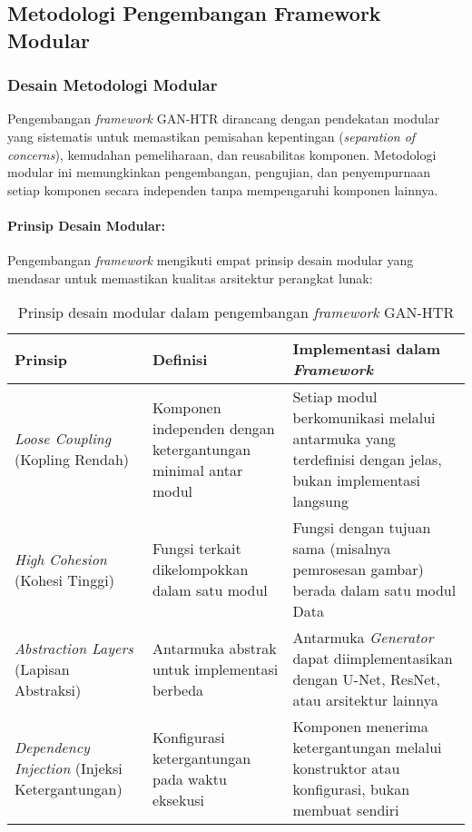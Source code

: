 \documentclass[12pt,a4paper]{article}
\begin{document}
\subsection{Metodologi Pengembangan Framework Modular}
\label{subsec:framework-modular}

\subsubsection{Desain Metodologi Modular}
Pengembangan \textit{framework} GAN-HTR dirancang dengan pendekatan modular yang sistematis untuk memastikan pemisahan kepentingan (\textit{separation of concerns}), kemudahan pemeliharaan, dan reusabilitas komponen. Metodologi modular ini memungkinkan pengembangan, pengujian, dan penyempurnaan setiap komponen secara independen tanpa mempengaruhi komponen lainnya.

\paragraph{Prinsip Desain Modular:}
Pengembangan \textit{framework} mengikuti empat prinsip desain modular yang mendasar untuk memastikan kualitas arsitektur perangkat lunak:

\begin{table}[H]
\centering
\caption{Prinsip desain modular dalam pengembangan \textit{framework} GAN-HTR}
\label{tab:prinsip-modular}
\small
\begin{tabular}{|p{3.5cm}|p{5cm}|p{5cm}|}
\hline
\textbf{Prinsip} & \textbf{Definisi} & \textbf{Implementasi dalam \textit{Framework}} \\ \hline
\textit{Loose Coupling} (Kopling Rendah) & Komponen independen dengan ketergantungan minimal antar modul & Setiap modul berkomunikasi melalui antarmuka yang terdefinisi dengan jelas, bukan implementasi langsung \\ \hline
\textit{High Cohesion} (Kohesi Tinggi) & Fungsi terkait dikelompokkan dalam satu modul & Fungsi dengan tujuan sama (misalnya pemrosesan gambar) berada dalam satu modul Data \\ \hline
\textit{Abstraction Layers} (Lapisan Abstraksi) & Antarmuka abstrak untuk implementasi berbeda & Antarmuka \textit{Generator} dapat diimplementasikan dengan U-Net, ResNet, atau arsitektur lainnya \\ \hline
\textit{Dependency Injection} (Injeksi Ketergantungan) & Konfigurasi ketergantungan pada waktu eksekusi & Komponen menerima ketergantungan melalui konstruktor atau konfigurasi, bukan membuat sendiri \\ \hline
\end{tabular}
\end{table}
\end{document}
